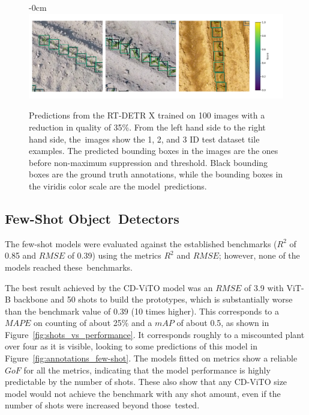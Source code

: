 \documentclass[12pt,a4paper,oneside]{report}
\newlength{\extralength}
\begin{document}
\begin{landscape}
\begin{figure}
  \begin{adjustwidth}{-\extralength}{0cm}
  \centering
  \includegraphics[width=22cm]{Plots/many_shot_quality_annotations.pdf}
  \end{adjustwidth}
  \vspace{-12pt}\caption{Predictions from the RT-DETR X trained on 100 images with a reduction 
  in quality of 35\%.
  From the left hand side to the right hand side, the~images show the
  1, 2, and 3 ID test dataset tile examples.
  The predicted bounding boxes in the images are the ones before 
  non-maximum suppression and threshold.
   Black bounding boxes are the ground truth annotations, while the bounding boxes 
   in the viridis color scale are the model~predictions.}
  \label{fig:annotations_many-shots_quality}
\end{figure}
\end{landscape}

\subsection{Few-Shot Object~Detectors}

The few-shot models were evaluated against the established benchmarks ($R^2$ of 0.85 and $RMSE$ of 0.39) 
using the metrics $R^2$ and $RMSE$; however, none of the models reached these~benchmarks.

The best result achieved by the CD-ViTO model was an $RMSE$ of 3.9 with ViT-B backbone and 
50 shots to build the prototypes, which is substantially worse than the benchmark value of 0.39 (10 times higher). 
This corresponds to a $MAPE$ on counting of about 25\% 
and a $mAP$ of about 0.5, as shown in Figure~\ref{fig:shots_vs_performance}.
It corresponds roughly to a miscounted plant over four as it is visible, looking to
some predictions of this model in Figure~\ref{fig:annotations_few-shot}.
The models fitted on metrics show a reliable $GoF$ for all
the metrics, indicating that the model performance is highly predictable by the number of shots.
These also show that any CD-ViTO size model would not achieve the
benchmark with any shot amount, even if the number of shots were increased beyond those~tested.
\end{document}
